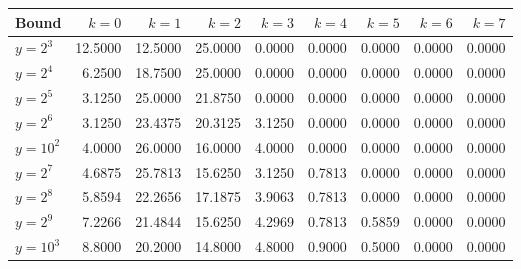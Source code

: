 \documentclass{article}
\theoremstyle{definition}
\begin{document}
\begin{table}[h!]
    \vspace*{-3cm}
    \small
    \begin{tabular}{l | rrrrrrrr}
        Bound     & $k = 0$   & $k = 1$                 & $k = 2$                 & $k= 3$                     & $k = 4$                     & $k = 5$                     & $k = 6$                     & $k = 7$                     \\
        \hline
        $y = 2^{3}$   & 12.5000 & 12.5000               & 25.0000               & 0.0000                & 0.0000                & 0.0000                & 0.0000                & 0.0000                \\
        $y = 2^{4}$   & 6.2500  & 18.7500               & 25.0000               & 0.0000                & 0.0000                & 0.0000                & 0.0000                & 0.0000                \\
        $y = 2^{5}$   & 3.1250  & 25.0000               & 21.8750               & 0.0000                & 0.0000                & 0.0000                & 0.0000                & 0.0000                \\
        $y = 2^{6}$   & 3.1250  & 23.4375               & 20.3125               & 3.1250                & 0.0000                & 0.0000                & 0.0000                & 0.0000                \\
        \hline
        $y = 10^{2}$  & 4.0000  & 26.0000               & 16.0000               & 4.0000                & 0.0000                & 0.0000                & 0.0000                & 0.0000                \\
        \hline
        $y = 2^{7}$   & 4.6875  & 25.7813               & 15.6250               & 3.1250                & 0.7813                & 0.0000                & 0.0000                & 0.0000                \\
        $y = 2^{8}$   & 5.8594  & 22.2656               & 17.1875               & 3.9063                & 0.7813                & 0.0000                & 0.0000                & 0.0000                \\
        $y = 2^{9}$   & 7.2266  & 21.4844               & 15.6250               & 4.2969                & 0.7813                & 0.5859                & 0.0000                & 0.0000                \\
        \hline
        $y = 10^{3}$  & 8.8000  & 20.2000               & 14.8000               & 4.8000                & 0.9000                & 0.5000                & 0.0000                & 0.0000                \\

\end{tabular}
\end{table}
\end{document}
